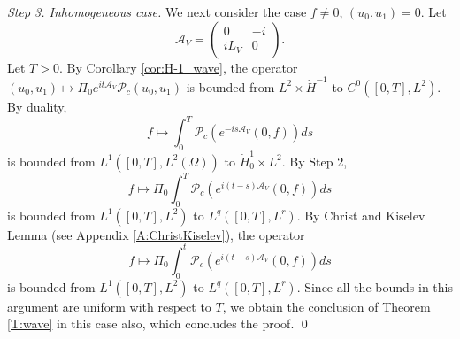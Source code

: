 \documentclass[10pt,leqno]{amsart}
\theoremstyle{definition}%
\theoremstyle{remark}
\numberwithin{equation}{section}
\renewcommand{\^}{\widehat}%
\newcommand{\AAA}{\mathcal{A}}
\newcommand{\PPP}{\mathcal{P}}
\begin{document}
\noindent\emph{Step 3. Inhomogeneous case.} We next consider the case $f\neq 0$, $(u_0,u_1)=0$. Let
\begin{equation}
\label{defAV}
\mathcal{A}_V=\begin{pmatrix} 
0 & -i \\
iL_V & 0
\end{pmatrix}.
\end{equation} 
Let $T>0$.
By Corollary \ref{cor:H-1_wave}, the operator $(u_0,u_1)\mapsto \Pi_0 e^{it\AAA_V}\PPP_c(u_0,u_1)$ is bounded from $L^2\times \dot{H}^{-1}$ to $C^0([0,T],L^2)$. By duality,
$$ f\mapsto\int_0^T \PPP_c\left(e^{-is\AAA_V} (0,f)\right)ds$$
is bounded from $L^1([0,T],L^2(\Omega))$ to $\dot{H}^{1}_0\times L^2$. By Step 2, 
$$f \mapsto \Pi_0\int_0^{T}\PPP_c\left(e^{i(t-s)\AAA_V} (0,f)\right)ds $$
is bounded from $L^1([0,T],L^2)$ to $L^q([0,T],L^r)$. By Christ and Kiselev Lemma (see Appendix \ref{A:ChristKiselev}), the operator
$$f \mapsto \Pi_0\int_0^{t}\PPP_c\left(e^{i(t-s)\AAA_V} (0,f)\right)ds $$
is bounded from $L^1([0,T],L^2)$ to $L^q([0,T],L^r)$. Since all the bounds in this argument are uniform with respect to $T$, we obtain the conclusion of Theorem \ref{T:wave} in this case also, which concludes the proof. \qed
\end{document}
